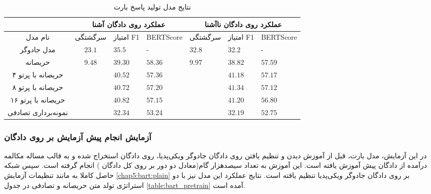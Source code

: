 \begin{table}[htb]
	\caption{نتایج مدل تولید پاسخ بارت}
	\label{table:bart_plain}
	\begin{tabular}{|c|c|l|l|l|l|l|}
		\hline
		\multicolumn{1}{|l|}{}                    & \multicolumn{3}{c|}{عملکرد روی دادگان آشنا}     & \multicolumn{3}{c|}{عملکرد روی دادگان نا‌آشنا}  \\ \hline
		نام مدل                                   & سرگشتگی                 & امتیاز F1 & BERTScore & سرگشتگی                 & امتیاز F1 & BERTScore \\ \hline
		مدل جادوگر                                & $23.1$                  & $35.5$    & -         & $32.8$                  & $32.2$    & -         \\ \hline
		حریصانه                                   & \multirow{5}{*}{$9.48$} & $39.30$   & $58.36$   & \multirow{5}{*}{$9.97$} & $38.82$   & $57.59$   \\ \cline{1-1} \cline{3-4} \cline{6-7} 
		حریصانه با پرتو ۴                         &                         & $40.52$   & $57.36$   &                         & $41.18$   & $57.17$   \\ \cline{1-1} \cline{3-4} \cline{6-7} 
		حریصانه با پرتو ۸                         &                         & $40.72$   & $57.20$   &                         & $41.34$   & $57.12$   \\ \cline{1-1} \cline{3-4} \cline{6-7} 
		حریصانه با پرتو ۱۶                        &                         & $40.82$   & $57.15$   &                         & $41.20$   & $56.80$   \\ \cline{1-1} \cline{3-4} \cline{6-7} 
		\multicolumn{1}{|l|}{نمونه‌برداری تصادفی} &                         & $32.34$   & $53.24$   &                         & $32.19$   & $52.75$   \\ \hline
	\end{tabular}
\end{table}


\subsubsection{آزمایش انجام پیش آزمایش بر روی دادگان
}

در این آزمایش،‌ مدل بارت، قبل از آموزش دیدن و تنظیم یافتن روی دادگان جادوگر ویکی‌‌پدیا، روی دادگان استخراج شده و به قالب مساله مکالمه‌ درآمده از دادگان 
پیش آموزش یافته است. این آموزش به تعداد سیصدهزار گام(معادل دو دور بر روی کل دادگان 
)
انجام گرفته است. سپس شبکه حاصل کاملا به مانند تنظیمات آزمایش
\ref{chap5:bart:plain}
بر روی دادگان جادوگر ویکی‌پدیا تنظیم یافته است. نتایج عملکرد این مدل نیز با دو استراتژی تولد متن حریصانه و تصادفی در جدول 
\ref{table:bart_pretrain}
 آمده است.

